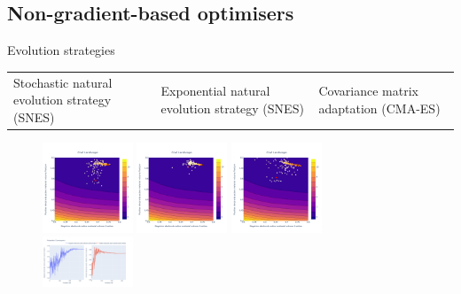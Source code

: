 \documentclass[aspectratio=169]{beamer} %
\begin{document}
\subsection{Non-gradient-based optimisers}
\begin{frame}{Evolution strategies}
    \vspace{-5mm}
    \begin{table}[]
        \centering
        \footnotesize
    \begin{tabularx}{0.86\textwidth}{*{3}{Y}}
         Stochastic natural evolution strategy (SNES) &
         Exponential natural evolution strategy (SNES) &
         Covariance matrix adaptation (CMA-ES)
    \end{tabularx}
    \end{table}

    \vspace{-5mm}
    \begin{figure}
        \centering
        \includegraphics[width=0.24\textwidth]{Images/Optimisers/snes_cost.png}
        \includegraphics[width=0.24\textwidth]{Images/Optimisers/xnes_cost.png}
        \includegraphics[width=0.24\textwidth]{Images/Optimisers/cmaes_cost.png} ~~~\\
        \includegraphics[width=0.24\textwidth]{Images/Optimisers/snes_params.png}

\end{figure}
\end{frame}
\end{document}

